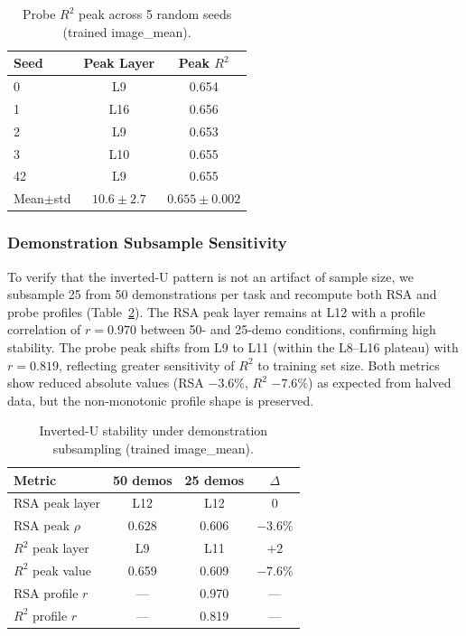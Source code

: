 \begin{table}[h]
\centering
\caption{Probe $R^2$ peak across 5 random seeds (trained image\_mean).}
\label{tab:seed_sensitivity}
\small
\begin{tabular}{lcc}
\toprule
Seed & Peak Layer & Peak $R^2$ \\
\midrule
0 & L9 & 0.654 \\
1 & L16 & 0.656 \\
2 & L9 & 0.653 \\
3 & L10 & 0.655 \\
42 & L9 & 0.655 \\
\midrule
Mean$\pm$std & $10.6\pm2.7$ & $0.655\pm0.002$ \\
\bottomrule
\end{tabular}
\end{table}

\subsubsection{Demonstration Subsample Sensitivity}
\label{sec:demo_sensitivity}

To verify that the inverted-U pattern is not an artifact of sample size, we subsample 25 from 50 demonstrations per task and recompute both RSA and probe profiles (Table~\ref{tab:demo_sensitivity}).
The RSA peak layer remains at L12 with a profile correlation of $r = 0.970$ between 50- and 25-demo conditions, confirming high stability.
The probe peak shifts from L9 to L11 (within the L8--L16 plateau) with $r = 0.819$, reflecting greater sensitivity of $R^2$ to training set size.
Both metrics show reduced absolute values (RSA $-3.6\%$, $R^2$ $-7.6\%$) as expected from halved data, but the non-monotonic profile shape is preserved.

\begin{table}[h]
\centering
\caption{Inverted-U stability under demonstration subsampling (trained image\_mean).}
\label{tab:demo_sensitivity}
\small
\begin{tabular}{lccc}
\toprule
Metric & 50 demos & 25 demos & $\Delta$ \\
\midrule
RSA peak layer & L12 & L12 & 0 \\
RSA peak $\rho$ & 0.628 & 0.606 & $-3.6\%$ \\
$R^2$ peak layer & L9 & L11 & $+2$ \\
$R^2$ peak value & 0.659 & 0.609 & $-7.6\%$ \\
RSA profile $r$ & --- & 0.970 & --- \\
$R^2$ profile $r$ & --- & 0.819 & --- \\
\bottomrule
\end{tabular}
\end{table}

